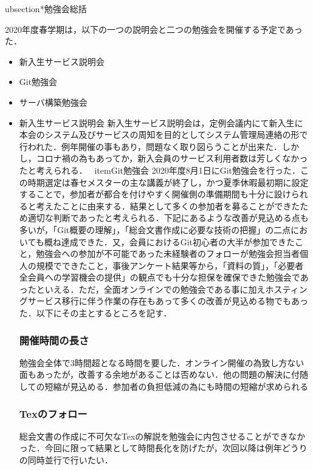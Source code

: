 ubsection*{勉強会総括}


2020年度春学期は，以下の一つの説明会と二つの勉強会を開催する予定であった．
\begin{itemize}
	\item 新入生サービス説明会
	\item Git勉強会
	\item サーバ構築勉強会
\end{itemize}

\begin{itemize}

	\item{新入生サービス説明会}
新入生サービス説明会は，定例会議内にて新入生に本会のシステム及びサービスの周知を目的としてシステム管理局連絡の形で行われた．例年開催の事もあり，問題なく取り図らうことが出来た．しかし，コロナ禍の為もあってか，新入会員のサービス利用者数は芳しくなかったと考えられる．
	\ item{Git勉強会}
2020年度8月1日にGit勉強会を行った．この時期選定は春セメスターの主な講義が終了し，かつ夏季休暇最初期に設定することで，参加者が都合を付けやすく開催側の準備期間も十分に設けられると考えたことに由来する．結果として多くの参加者を募ることができたため適切な判断であったと考えられる．下記にあるような改善が見込める点も多いが，「Git概要の理解」，「総会文書作成に必要な技術の把握」の二点においても概ね達成できた．又，会員におけるGit初心者の大半が参加できたこと，勉強会への参加が不可能であった未経験者のフォローが勉強会担当者個人の規模でできたこと，事後アンケート結果等から，「資料の質」，「必要者全会員への学習機会の提供」の観点でも十分な担保を確保できた勉強会であったといえる．ただ，全面オンラインでの勉強会である事に加えホスティングサービス移行に伴う作業の存在もあって多くの改善が見込める物でもあった．以下にその主とするところを記す．
\subsubsection*{開催時間の長さ}
勉強会全体で3時間超となる時間を要した．オンライン開催の為致し方ない面もあったが，改善する余地があることは否めない．他の問題の解決に付随しての短縮が見込める．参加者の負担低減の為にも時間の短縮が求められる
\subsubsection*{Texのフォロー}
総会文書の作成に不可欠なTexの解説を勉強会に内包させることができなかった．今回に限って結果として時間長化を防げたが，次回以降は例年どうりの同時並行で行いたい．

\end{itemize}
